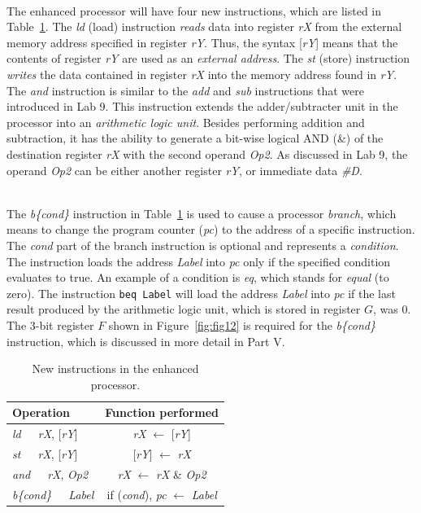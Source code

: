 \documentclass[epsfig,10pt,fullpage]{article} \addtolength{\textwidth}{1.5in}
\begin{document}
~\\
\noindent
The enhanced processor will have four new instructions, which are listed
in Table~\ref{tab:new_instr}.  The {\it ld} (load) instruction {\it reads} data into 
register {\it rX} from the external memory address specified in register {\it rY}. Thus, 
the syntax [{\it rY}] means that the contents of register {\it rY} are used as an
{\it external address}. The {\it st} (store) instruction {\it writes} the data contained 
in register {\it rX} into the memory address found in {\it rY}. The {\it and} instruction 
is similar to the {\it add} and {\it sub} instructions that were introduced in Lab 9.
This instruction extends the adder/subtracter unit in the processor into an
{\it arithmetic logic unit}. Besides performing addition and subtraction, it 
has the ability to generate a bit-wise logical AND (\&) of the destination register
{\it rX} with the second operand {\it Op2}. As discussed
in Lab 9, the operand {\it Op2} can be either another register {\it rY}, or immediate
data {\it \#D}.

~\\
\noindent
The {\it b\{cond\}} instruction in Table~\ref{tab:new_instr} is used 
to cause a processor {\it branch}, which means to
change the program counter ({\it pc}) to the address of a specific instruction. The {\it cond}
part of the branch instruction is optional and represents a {\it condition}. The instruction 
loads the address {\it Label} into {\it pc} only if the specified condition evaluates to true.
An example of a condition is {\it eq}, which stands for {\it equal} (to zero). 
The instruction \texttt{beq Label} will load the address {\it Label} into {\it pc} if the
last result produced by the arithmetic logic unit, which is stored in register $G$, was 0. 
The 3-bit register $F$ shown in Figure~\ref{fig:fig12} is required for the {\it b\{cond\}} 
instruction, which is discussed in more detail in Part V.

\begin{table}[H]
\begin{center}
\begin{tabular}{l|c}
\rule[-0.075in]{0in}{0.25in}Operation & Function performed \\ \hline 
\rule[-0.075in]{0in}{0.25in}{\it ld}~~~{\it rX}, [{\it rY}] & {\it rX} $\leftarrow$ [{\it rY}] \\ 
\rule[-0.075in]{0in}{0.25in}{\it st}~~~{\it rX}, [{\it rY}] & [{\it rY}] $\leftarrow$ {\it rX} \\ 
\rule[-0.075in]{0in}{0.25in}{\it and}~~~{\it rX}, {\it Op2} & {\it rX} $\leftarrow$ {\it rX} \& {\it Op2} \\ 
\rule[-0.075in]{0in}{0.25in}{\it b\{cond\}}~~~{\it Label} & if ({\it cond}), {\it pc} $\leftarrow$ {\it Label} \\ 
\end{tabular}
\caption{New instructions in the enhanced processor.}
\label{tab:new_instr}
\end{center}
\end{table}
\end{document}
